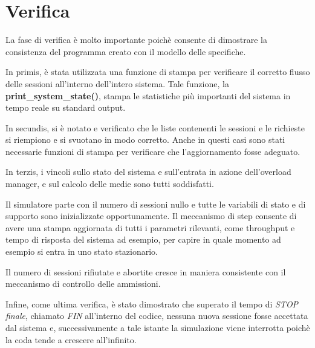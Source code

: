  
\chapter{Verifica}

La fase di verifica è molto importante poichè consente di dimostrare la consistenza del programma creato con il modello delle specifiche.

\vspace{0.3cm}In primis, è stata utilizzata una funzione di stampa per verificare il corretto flusso delle sessioni all'interno dell'intero sistema. Tale funzione, la \textbf{print\_system\_state()}, stampa le statistiche più importanti del sistema in tempo reale su standard output.

\vspace{0.3cm}In secundis, si è notato e verificato che le liste contenenti le sessioni e le richieste si riempiono e si svuotano in modo corretto. Anche in questi casi sono stati necessarie funzioni di stampa per verificare che l'aggiornamento fosse adeguato.

\vspace{0.3cm}In terzis, i vincoli sullo stato del sistema e sull'entrata in azione dell'overload manager, e sul calcolo delle medie sono tutti soddisfatti.

\vspace{0.3cm}Il simulatore parte con il numero di sessioni nullo e tutte le variabili di stato e di supporto sono inizializzate opportunamente. Il meccanismo di step consente di avere una stampa aggiornata di tutti i parametri rilevanti, come throughput e tempo di risposta del sistema ad esempio, per capire in quale momento ad esempio si entra in uno stato stazionario.

\vspace{0.3cm}Il numero di sessioni rifiutate e abortite cresce in maniera consistente con il meccanismo di controllo delle ammissioni.

\vspace{0.3cm}Infine, come ultima verifica, è stato dimostrato che superato il tempo di \textit{STOP finale}, chiamato \textit{FIN} all'interno del codice, nessuna nuova sessione fosse accettata dal sistema e, successivamente a tale istante la simulazione viene interrotta poichè la coda tende a crescere all'infinito.